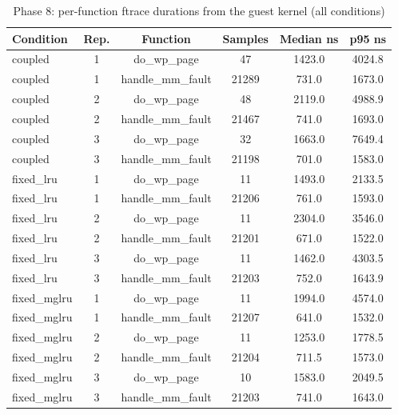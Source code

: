 \begin{table}[t]
\caption{Phase 8: per-function ftrace durations from the guest kernel (all conditions)}
\label{tab:kernel_ftrace}
\centering\footnotesize
\setlength{\tabcolsep}{2pt}
\begin{tabular}{@{}lccccc@{}}
\toprule
Condition & Rep. & Function & Samples & Median ns & p95 ns \\
\midrule
coupled & 1 & do\_wp\_page & 47 & 1423.0 & 4024.8 \\
coupled & 1 & handle\_mm\_fault & 21289 & 731.0 & 1673.0 \\
coupled & 2 & do\_wp\_page & 48 & 2119.0 & 4988.9 \\
coupled & 2 & handle\_mm\_fault & 21467 & 741.0 & 1693.0 \\
coupled & 3 & do\_wp\_page & 32 & 1663.0 & 7649.4 \\
coupled & 3 & handle\_mm\_fault & 21198 & 701.0 & 1583.0 \\
fixed\_lru & 1 & do\_wp\_page & 11 & 1493.0 & 2133.5 \\
fixed\_lru & 1 & handle\_mm\_fault & 21206 & 761.0 & 1593.0 \\
fixed\_lru & 2 & do\_wp\_page & 11 & 2304.0 & 3546.0 \\
fixed\_lru & 2 & handle\_mm\_fault & 21201 & 671.0 & 1522.0 \\
fixed\_lru & 3 & do\_wp\_page & 11 & 1462.0 & 4303.5 \\
fixed\_lru & 3 & handle\_mm\_fault & 21203 & 752.0 & 1643.9 \\
fixed\_mglru & 1 & do\_wp\_page & 11 & 1994.0 & 4574.0 \\
fixed\_mglru & 1 & handle\_mm\_fault & 21207 & 641.0 & 1532.0 \\
fixed\_mglru & 2 & do\_wp\_page & 11 & 1253.0 & 1778.5 \\
fixed\_mglru & 2 & handle\_mm\_fault & 21204 & 711.5 & 1573.0 \\
fixed\_mglru & 3 & do\_wp\_page & 10 & 1583.0 & 2049.5 \\
fixed\_mglru & 3 & handle\_mm\_fault & 21203 & 741.0 & 1643.0 \\
\bottomrule
\end{tabular}
\end{table}
